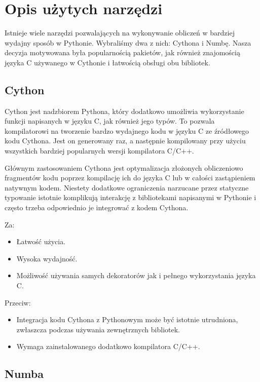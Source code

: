 \section{Opis użytych narzędzi}

Istnieje wiele narzędzi pozwalających na wykonywanie obliczeń w bardziej
wydajny sposób w Pythonie.
Wybraliśmy dwa z nich: Cythona i Numbę.
Nasza decyzja motywowana była popularnością pakietów,
jak również znajomością języka C używanego w Cythonie
i łatwością obsługi obu bibliotek.


\subsection{Cython}

Cython jest nadzbiorem Pythona, który dodatkowo umożliwia wykorzystanie
funkcji napisanych w języku C, jak również jego typów.
To pozwala kompilatorowi na tworzenie bardzo wydajnego kodu w języku
C ze źródłowego kodu Cythona.
Jest on generowany raz, a następnie kompilowany przy użyciu wszystkich
bardziej popularnych wersji kompilatora C/C++.

Głównym zastosowaniem Cythona jest optymalizacja złożonych obliczeniowo
fragmentów kodu poprzez kompilację ich do języka C lub w całości
zastąpieniem natywnym kodem.
Niestety dodatkowe ograniczenia narzucane przez statyczne typowanie
istotnie komplikują interakcję z bibliotekami napisanymi w Pythonie
i często trzeba odpowiednio je integrować z kodem Cythona.

Za:
\begin{itemize}
    \item Łatwość użycia.
    \item Wysoka wydajność.
    \item Możliwość używania samych dekoratorów jak i pełnego wykorzystania
    języka C\@.
\end{itemize}

Przeciw:
\begin{itemize}
    \item Integracja kodu Cythona z Pythonowym może być istotnie utrudniona,
    zwłaszcza podczas używania zewnętrznych bibliotek.
    \item Wymaga zainstalowanego dodatkowo kompilatora C/C++.
\end{itemize}


\subsection{Numba}

